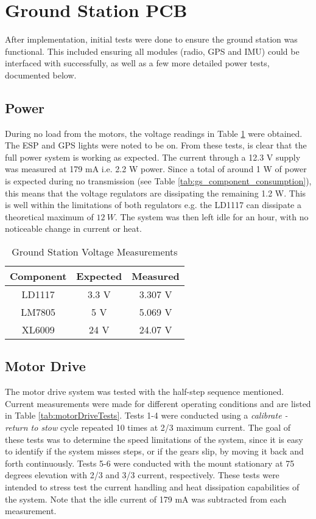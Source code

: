 \section{Ground Station PCB}

After implementation, initial tests were done to ensure the ground station was functional. This included ensuring all modules (radio, GPS and IMU) could be interfaced with successfully, as well as a few more detailed power tests, documented below.

\subsection{Power}

During no load from the motors, the voltage readings in Table \ref{tab:gs_pcb_voltage} were obtained. The ESP and GPS lights were noted to be on. From these tests, is clear that the full power system is working as expected. The current through a 12.3 V supply was measured at 179 mA i.e. 2.2 W power. Since a total of around 1 W of power is expected during no transmission (see Table \ref{tab:gs_component_consumption}), this means that the voltage regulators are dissipating the remaining 1.2 W. This is well within the limitations of both regulators e.g. the LD1117 can dissipate a theoretical maximum of $\SI{12}{W}$. The system was then left idle for an hour, with no noticeable change in current or heat.
\begin{table}[!htb]
  \centering
  \renewcommand{\arraystretch}{1.2}
  \begin{tabular}{ |c|c|c| }
  \hline
  \textbf{Component}        & \textbf{Expected}     & \textbf{Measured}  \\
  \hline
  LD1117                 &  3.3 V             & 3.307 V \\  \hline
  LM7805                 &  5 V               & 5.069 V \\  \hline
  XL6009                 &  24 V             & 24.07 V  \\ \hline
  \end{tabular}
  \caption{Ground Station Voltage Measurements}
  \label{tab:gs_pcb_voltage}
\end{table}

\subsection{Motor Drive}
The motor drive system was tested with the half-step sequence mentioned. Current measurements were made for different operating conditions and are listed in Table \ref{tab:motorDriveTests}. Tests 1-4 were conducted using a \textit{calibrate - return to stow} cycle repeated 10 times at 2/3 maximum current. The goal of these tests was to determine the speed limitations of the system, since it is easy to identify if the system misses steps, or if the gears slip, by moving it back and forth continuously. Tests 5-6 were conducted with the mount stationary at 75 degrees elevation with 2/3 and 3/3 current, respectively. These tests were intended to stress test the current handling and heat dissipation capabilities of the system. Note that the idle current of 179 mA was subtracted from each measurement.

